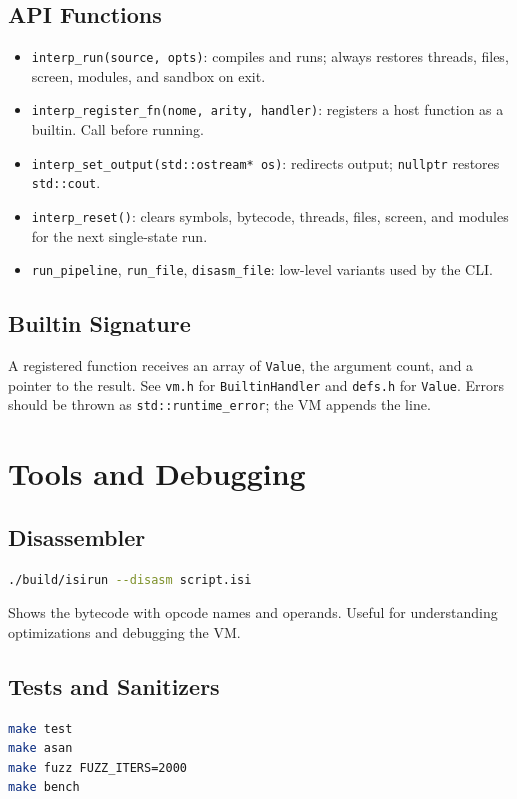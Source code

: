 \documentclass[11pt,a4paper,oneside]{report}
\newcommand{\code}[1]{\texttt{#1}}
\newcommand{\file}[1]{\texttt{#1}}
\begin{document}
\section{API Functions}
\begin{itemize}
  \item \code{interp\_run(source, opts)}: compiles and runs; always
        restores threads, files, screen, modules, and sandbox on exit.
  \item \code{interp\_register\_fn(nome, arity, handler)}: registers a
        host function as a builtin. Call before running.
  \item \code{interp\_set\_output(std::ostream* os)}: redirects output;
        \code{nullptr} restores \code{std::cout}.
  \item \code{interp\_reset()}: clears symbols, bytecode, threads,
        files, screen, and modules for the next single-state run.
  \item \code{run\_pipeline}, \code{run\_file}, \code{disasm\_file}:
        low-level variants used by the CLI.
\end{itemize}

\section{Builtin Signature}
A registered function receives an array of \code{Value}, the argument
count, and a pointer to the result. See \file{vm.h} for
\code{BuiltinHandler} and \file{defs.h} for \code{Value}. Errors should
be thrown as \code{std::runtime\_error}; the VM appends the line.

\chapter{Tools and Debugging}
\label{cap:ferramentas}

\section{Disassembler}
\begin{lstlisting}[language=bash]
./build/isirun --disasm script.isi
\end{lstlisting}

Shows the bytecode with opcode names and operands. Useful for
understanding optimizations and debugging the VM.

\section{Tests and Sanitizers}
\begin{lstlisting}[language=bash]
make test
make asan
make fuzz FUZZ_ITERS=2000
make bench
\end{lstlisting}
\end{document}
